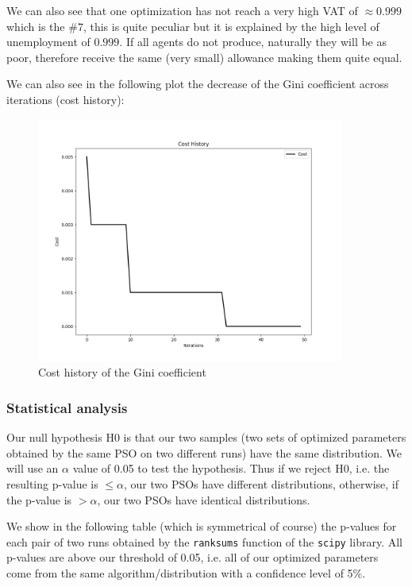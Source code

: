             We can also see that one optimization has not reach a very high VAT of $\approx 0.999$ which is the \#7, this is quite peculiar but it is explained by the high level of unemployment of $0.999$. If all agents do not produce, naturally they will be as poor, therefore receive the same (very small) allowance making them quite equal.

            We can also see in the following plot the decrease of the Gini coefficient across iterations (cost history):

            \begin{figure}[H]
                \centering
                \includegraphics[width=0.9\textwidth]{img/opti/costHistoryGini.png}
                \caption{Cost history of the Gini coefficient}
        \end{figure}

        \subsubsection{Statistical analysis}
        
            Our null hypothesis H0 is that our two samples (two sets of optimized parameters obtained by the same PSO on two different runs) have the same distribution. We will use an $\alpha$ value of 0.05 to test the hypothesis. Thus if we reject H0, i.e. the resulting p-value is $\leq \alpha$, our two PSOs have different distributions, otherwise, if the p-value is $> \alpha$, our two PSOs have identical distributions.

            We show in the following table (which is symmetrical of course) the p-values for each pair of two runs obtained by the \texttt{ranksums} function of the \texttt{scipy} library. All p-values are above our threshold of 0.05, i.e. all of our optimized parameters come from the same algorithm/distribution with a confidence level of 5\%.

